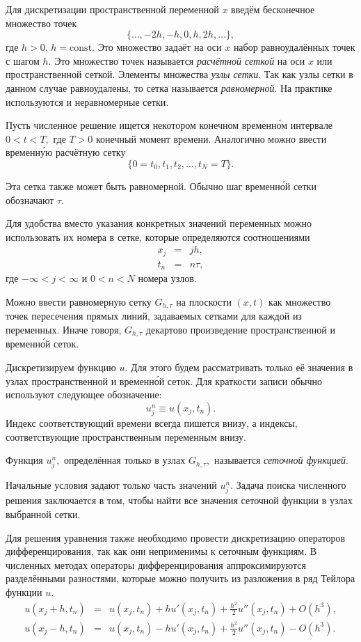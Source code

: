 Для дискретизации пространственной переменной $x$ введём бесконечное
множество точек
\[
\{\dots,-2h,-h,0,h,2h,\dots\},
\]
где $h>0,\, h=\mathrm{const}$. Это множество задаёт на оси $x$ набор
равноудалённых точек с шагом $h$. Это множество точек называется
\emph{расчётной сеткой} на оси $x$ или пространственной сеткой. Элементы
множества \textemdash{} \emph{узлы сетки}. Так как узлы сетки в данном
случае равноудалены, то сетка называется \emph{равномерной}. На практике
используются и неравномерные сетки.

Пусть численное решение ищется некотором конечном временн\'{о}м интервале
$0<t<T,$ где $T>0$ \textemdash{} конечный момент времени. Аналогично
можно ввести временн\'{у}ю расчётную сетку 
\[
\{0=t_{0},t_{1},t_{2},\dots,t_{N}=T\}.
\]
 

Эта сетка также может быть равномерной. Обычно шаг временн\'{о}й сетки
обозначают $\tau.$

Для удобства вместо указания конкретных значений переменных можно
использовать их номера в сетке, которые определяются соотношениями
\begin{eqnarray*}
x_{j} & = & jh,\\
t_{n} & = & n\tau,
\end{eqnarray*}
где $-\infty<j<\infty$ и $0<n<N$ \textemdash{} номера узлов.

Можно ввести равномерную сетку $G_{h,\tau}$ на плоскости $(x,t)$
как множество точек пересечения прямых линий, задаваемых сетками для
каждой из переменных. Иначе говоря, $G_{h,\tau}$ \textemdash{} декартово
произведение пространственной и временн\'{о}й сеток.

Дискретизируем функцию $u$. Для этого будем рассматривать только
её значения в узлах пространственной и временн\'{о}й сеток. Для краткости
записи обычно используют следующее обозначение:
\[
u_{j}^{n}\equiv u(x_{j},t_{n}).
\]
Индекс соответствующий времени всегда пишется внизу, а индексы, соответствующие
пространственным переменным \textemdash{} внизу.

Функция $u_{j}^{n},$ определённая только в узлах $G_{h,\tau},$ называется
\emph{сеточной функцией}.

Начальные условия задают только часть значений $u_{j}^{n}.$ Задача
поиска численного решения заключается в том, чтобы найти все значения
сеточной функции в узлах выбранной сетки.

Для решения уравнения также необходимо провести дискретизацию операторов
дифференцирования, так как они неприменимы к сеточным функциям. В
численных методах операторы дифференцирования аппроксимируются разделёнными
разностями, которые можно получить из разложения в ряд Тейлора функции
$u.$
\begin{eqnarray*}
u(x_{j}+h,t_{n}) & = & u(x_{j},t_{n})+hu'(x_{j},t_{n})+\frac{h^{2}}{2}u''(x_{j},t_{n})+O(h^{3}),\\
u(x_{j}-h,t_{n}) & = & u(x_{j},t_{n})-hu'(x_{j},t_{n})+\frac{h^{2}}{2}u''(x_{j},t_{n})-O(h^{3}).
\end{eqnarray*}


